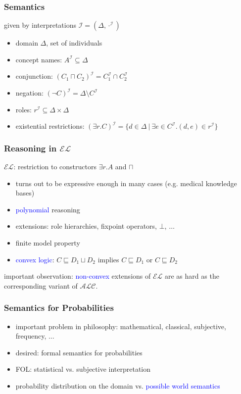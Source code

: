 \documentclass{beamer}
\newcommand{\el}{\ensuremath{\mathcal{EL}}\xspace}
\newcommand{\alc}{\ensuremath{\mathcal{ALC}}\xspace}
\newcommand{\I}{\ensuremath{\mathcal{I}}\xspace}
\renewcommand{\emph}[1]{\textcolor{blue}{#1}}
\begin{document}
\begin{frame}
  \frametitle{Semantics}
  given by interpretations $\I=(\Delta,\cdot^{\I})$
  \begin{itemize}
    \item domain $\Delta$, set of individuals
    \item concept names: $A^{\I}\subseteq\Delta$
    \item conjunction: $(C_1\sqcap C_2)^{\I}=C_1^{\I}\cap C_2^{\I}$
    \item negation: $(\neg C)^{\I}=\Delta\setminus C^{\I}$
    \item roles: $r^{\I}\subseteq\Delta\times\Delta$
    \item existential restrictions: $(\exists r.C)^{\I}=\{d\in\Delta~|~\exists e\in C^{\I}.(d,e)\in r^{\I}\}$
  \end{itemize}
\end{frame}


\begin{frame}
  \frametitle{Reasoning in \el}
  \el: restriction to constructors $\exists r.A$ and $\sqcap$
  \begin{itemize}
    \item turns out to be expressive enough in many cases (\mbox{e.g.} medical knowledge bases)
    \item \emph{polynomial} reasoning
    \item extensions: role hierarchies, fixpoint operators, $\bot$, $\dots$
    \item finite model property 
    \item \emph{convex logic}: $C\sqsubseteq D_1\sqcup D_2$ implies $C\sqsubseteq D_1$ or $C\sqsubseteq D_2$
  \end{itemize}
  important observation: \emph{non-convex} extensions of \el are as hard as the corresponding variant of \alc.
\end{frame}


\begin{frame}
  \frametitle{Semantics for Probabilities}
  \begin{itemize}
    \item important problem in philosophy: mathematical, classical, subjective, frequency, $\ldots$
    \item desired: formal semantics for probabilities
    \item FOL: statistical vs. subjective interpretation \cite{halpern}
    \item probability distribution on the domain vs. \emph{possible world semantics}
  \end{itemize}
\end{frame}
\end{document}
